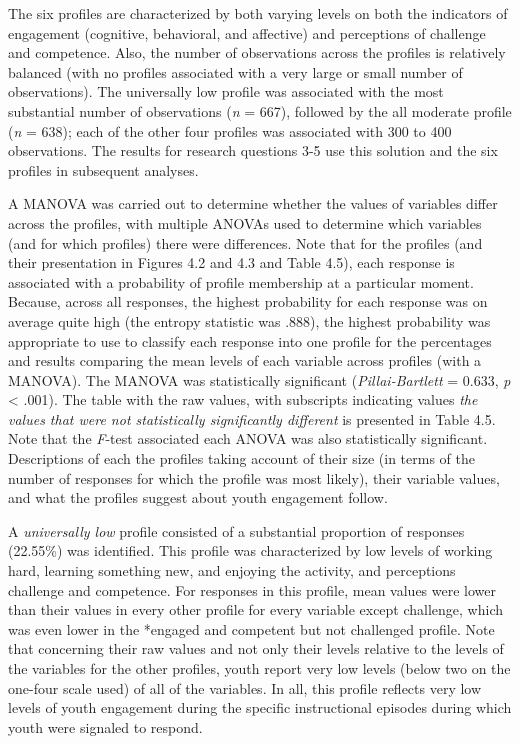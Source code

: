 \documentclass[]{msu-thesis}
\theoremstyle{definition}
\theoremstyle{definition}
\theoremstyle{definition}
\theoremstyle{remark}
\begin{document}
The six profiles are characterized by both varying levels on both the
indicators of engagement (cognitive, behavioral, and affective) and
perceptions of challenge and competence. Also, the number of
observations across the profiles is relatively balanced (with no
profiles associated with a very large or small number of observations).
The universally low profile was associated with the most substantial
number of observations (\emph{n} = 667), followed by the all moderate
profile (\emph{n} = 638); each of the other four profiles was associated
with 300 to 400 observations. The results for research questions 3-5 use
this solution and the six profiles in subsequent analyses.

A MANOVA was carried out to determine whether the values of variables
differ across the profiles, with multiple ANOVAs used to determine which
variables (and for which profiles) there were differences. Note that for
the profiles (and their presentation in Figures 4.2 and 4.3 and Table
4.5), each response is associated with a probability of profile
membership at a particular moment. Because, across all responses, the
highest probability for each response was on average quite high (the
entropy statistic was .888), the highest probability was appropriate to
use to classify each response into one profile for the percentages and
results comparing the mean levels of each variable across profiles (with
a MANOVA). The MANOVA was statistically significant
(\emph{Pillai-Bartlett} = 0.633, \emph{p} \textless{} .001). The table
with the raw values, with subscripts indicating values \emph{the values
that were not statistically significantly different} is presented in
Table 4.5. Note that the \emph{F}-test associated each ANOVA was also
statistically significant. Descriptions of each the profiles taking
account of their size (in terms of the number of responses for which the
profile was most likely), their variable values, and what the profiles
suggest about youth engagement follow.

A \emph{universally low} profile consisted of a substantial proportion
of responses (22.55\%) was identified. This profile was characterized by
low levels of working hard, learning something new, and enjoying the
activity, and perceptions challenge and competence. For responses in
this profile, mean values were lower than their values in every other
profile for every variable except challenge, which was even lower in the
*engaged and competent but not challenged profile. Note that concerning
their raw values and not only their levels relative to the levels of the
variables for the other profiles, youth report very low levels (below
two on the one-four scale used) of all of the variables. In all, this
profile reflects very low levels of youth engagement during the specific
instructional episodes during which youth were signaled to respond.
\end{document}
